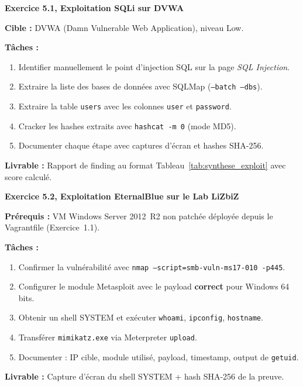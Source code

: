 \begin{boxexo}
\textbf{Exercice 5.1, Exploitation SQLi sur DVWA}

\medskip
\textbf{Cible :} DVWA (Damn Vulnerable Web Application), niveau Low.

\medskip
\textbf{Tâches :}
\begin{enumerate}
    \item Identifier manuellement le point d'injection SQL sur la page
          \textit{SQL Injection}.
    \item Extraire la liste des bases de données avec SQLMap
          (\texttt{--batch --dbs}).
    \item Extraire la table \texttt{users} avec les colonnes
          \texttt{user} et \texttt{password}.
    \item Cracker les hashes extraits avec \texttt{hashcat -m 0}
          (mode MD5).
    \item Documenter chaque étape avec captures d'écran et hashes
          SHA-256.
\end{enumerate}

\medskip
\textbf{Livrable :} Rapport de finding au format Tableau~\ref{tab:synthese_exploit}
avec score  calculé.
\end{boxexo}

\begin{boxexo}
\textbf{Exercice 5.2, Exploitation EternalBlue sur le Lab LiZbiZ}

\medskip
\textbf{Prérequis :} VM Windows Server 2012~R2 non patchée déployée
depuis le Vagrantfile (Exercice~1.1).

\medskip
\textbf{Tâches :}
\begin{enumerate}
    \item Confirmer la vulnérabilité avec
          \texttt{nmap --script=smb-vuln-ms17-010 -p445}.
    \item Configurer le module Metasploit avec le payload
          \textbf{correct} pour Windows 64 bits.
    \item Obtenir un shell SYSTEM et exécuter \texttt{whoami},
          \texttt{ipconfig}, \texttt{hostname}.
    \item Transférer \texttt{mimikatz.exe} via Meterpreter
          \texttt{upload}.
    \item Documenter : IP cible, module utilisé, payload, timestamp,
          output de \texttt{getuid}.
\end{enumerate}

\medskip
\textbf{Livrable :} Capture d'écran du shell SYSTEM + hash SHA-256
de la preuve.
\end{boxexo}
